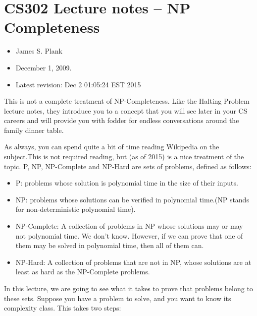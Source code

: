 \documentclass[12pt]{article}
\begin{document}
\section{CS302 Lecture notes -- NP Completeness}\begin{itemize}
\item  James S. Plank 

\item  December 1, 2009.

\item  Latest revision: Dec  2 01:05:24 EST 2015

\end{itemize}
 This is not a complete treatment of NP-Completeness.  Like the Halting Problem
lecture notes, they introduce you to a concept that you will see later in 
your CS careers and will provide you with fodder for endless conversations
around the family dinner table. 


As always, you can spend quite a bit of time reading Wikipedia on the 
subject.This is not required reading, but (as of 2015) is a nice treatment of the topic.
P, NP, NP-Complete and NP-Hard are sets of problems, defined as follows:

\begin{itemize}
\item  {\Large P}: problems whose solution is polynomial time in the size of their inputs.

\item  {\Large NP}: problems whose solutions can be verified in polynomial time.(NP stands for non-deterministic polynomial time).

\item  {\Large NP-Complete}: A collection of problems in NP whose solutions may or may not
polynomial time.  We don't know.  However, if we can prove that one of them may be solved
in polynomial time, then all of them can.

\item  {\Large NP-Hard}: A collection of problems that are not in NP, whose solutions are at least as hard
as the NP-Complete problems. 

\end{itemize}
In this lecture, we are going to see what it takes to prove that problems belong
to these sets.  
Suppose you have a problem to solve, and you want to know its complexity class.
This takes two steps: 
\end{document}
